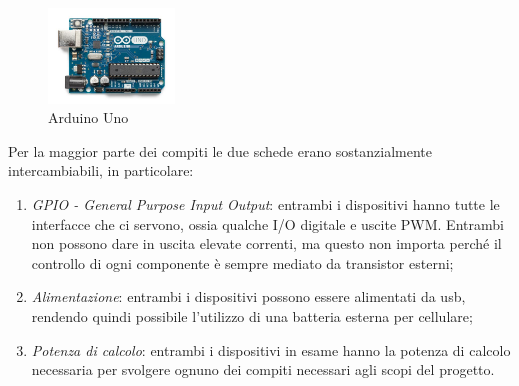 \documentclass[12pt]{article}
\newcommand{\imgsz}{0.3\textwidth}
\begin{document}
\begin{figure}[h]
\includegraphics[width=\imgsz]{Uno}
\centering
\caption{Arduino Uno}
\label{fig:uno}
\end{figure}

Per la maggior parte dei compiti le due schede erano sostanzialmente intercambiabili, in particolare:
\begin{enumerate}
\item \emph{GPIO - General Purpose Input Output}: entrambi i dispositivi hanno tutte le interfacce che ci servono, ossia qualche I/O digitale e uscite PWM. Entrambi non possono dare in uscita elevate correnti, ma questo non importa perché il controllo di ogni componente è sempre mediato da transistor esterni;
\item \emph{Alimentazione}: entrambi i dispositivi possono essere alimentati da usb, rendendo quindi possibile l'utilizzo di una batteria esterna per cellulare;
\item \emph{Potenza di calcolo}: entrambi i dispositivi in esame hanno la potenza di calcolo necessaria per svolgere ognuno dei compiti necessari agli scopi del progetto.
\end{enumerate} 
\end{document}
